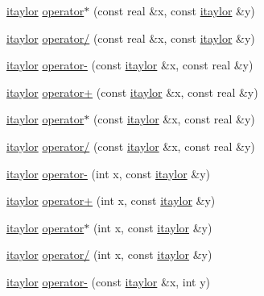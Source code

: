 \begin{DoxyCompactItemize}
\item 
\hyperlink{classtaylor_1_1itaylor}{itaylor} \hyperlink{namespacetaylor_afb0205c63be46b8c4d65b46f0f2c63d5}{operator$\ast$} (const real \&x, const \hyperlink{classtaylor_1_1itaylor}{itaylor} \&y)
\item 
\hyperlink{classtaylor_1_1itaylor}{itaylor} \hyperlink{namespacetaylor_ab62d7c3647e2a62d7863f6cb838ed71f}{operator/} (const real \&x, const \hyperlink{classtaylor_1_1itaylor}{itaylor} \&y)
\item 
\hyperlink{classtaylor_1_1itaylor}{itaylor} \hyperlink{namespacetaylor_a32e05ef71dbf31a76381ce8e36d8684d}{operator-\/} (const \hyperlink{classtaylor_1_1itaylor}{itaylor} \&x, const real \&y)
\item 
\hyperlink{classtaylor_1_1itaylor}{itaylor} \hyperlink{namespacetaylor_aa32df806dfcdb79632f619d6e725877b}{operator+} (const \hyperlink{classtaylor_1_1itaylor}{itaylor} \&x, const real \&y)
\item 
\hyperlink{classtaylor_1_1itaylor}{itaylor} \hyperlink{namespacetaylor_ac5cd097e68711b10ef867594c1c4873e}{operator$\ast$} (const \hyperlink{classtaylor_1_1itaylor}{itaylor} \&x, const real \&y)
\item 
\hyperlink{classtaylor_1_1itaylor}{itaylor} \hyperlink{namespacetaylor_a240b2c541cf0d46b9a7810987448631c}{operator/} (const \hyperlink{classtaylor_1_1itaylor}{itaylor} \&x, const real \&y)
\item 
\hyperlink{classtaylor_1_1itaylor}{itaylor} \hyperlink{namespacetaylor_a8ba1d848b912b57f58e2dbbbb1da7091}{operator-\/} (int x, const \hyperlink{classtaylor_1_1itaylor}{itaylor} \&y)
\item 
\hyperlink{classtaylor_1_1itaylor}{itaylor} \hyperlink{namespacetaylor_ad3050b08b9a846b6b6d7556593d4d43f}{operator+} (int x, const \hyperlink{classtaylor_1_1itaylor}{itaylor} \&y)
\item 
\hyperlink{classtaylor_1_1itaylor}{itaylor} \hyperlink{namespacetaylor_a0584bb8817c35fb018eb6a16346396fa}{operator$\ast$} (int x, const \hyperlink{classtaylor_1_1itaylor}{itaylor} \&y)
\item 
\hyperlink{classtaylor_1_1itaylor}{itaylor} \hyperlink{namespacetaylor_aa68052fbd6ae385609fb861cd61c970d}{operator/} (int x, const \hyperlink{classtaylor_1_1itaylor}{itaylor} \&y)
\item 
\hyperlink{classtaylor_1_1itaylor}{itaylor} \hyperlink{namespacetaylor_a99a5e76ba886177f7789b309a1321c32}{operator-\/} (const \hyperlink{classtaylor_1_1itaylor}{itaylor} \&x, int y)
\item 

\end{DoxyCompactItemize}

